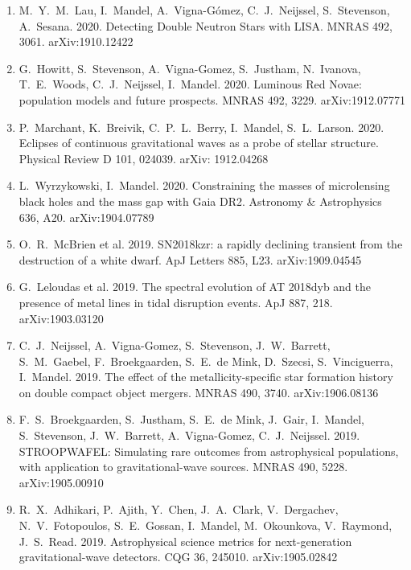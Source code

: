 \documentclass[margin,line]{res}
\begin{document}
\begin{resume}
\begin{enumerate}
\item M.~Y.~M.~Lau, I.~Mandel, A.~Vigna-G\'{o}mez, C.~J.~Neijssel, S.~Stevenson, A.~Sesana.  2020.  Detecting Double Neutron Stars with LISA.  MNRAS 492, 3061.  arXiv:1910.12422

\item G.~Howitt, S.~Stevenson, A.~Vigna-Gomez, S.~Justham, N.~Ivanova, T.~E.~Woods, C.~J.~Neijssel, I.~Mandel.  2020.  Luminous Red Novae: population models and future prospects.  MNRAS 492, 3229.  arXiv:1912.07771 

\item P.~Marchant, K.~Breivik, C.~P.~L.~Berry, I.~Mandel, S.~L.~Larson. 2020.  Eclipses of continuous gravitational waves as a probe of stellar structure.  Physical Review D 101, 024039.
arXiv: 1912.04268

\item L.~Wyrzykowski, I.~Mandel.  2020.  Constraining the masses of microlensing black holes and the mass gap with Gaia DR2.  Astronomy \& Astrophysics 636, A20.  arXiv:1904.07789

\item O.~R.~McBrien et al. 2019. SN2018kzr: a rapidly declining transient from the destruction of a white dwarf. ApJ Letters 885, L23.  arXiv:1909.04545

\item G.~Leloudas et al.  2019. The spectral evolution of AT 2018dyb and the presence of metal lines in tidal disruption events.  ApJ 887, 218.  arXiv:1903.03120

\item C.~J.~Neijssel, A.~Vigna-Gomez, S.~Stevenson, J.~W.~Barrett, S.~M.~Gaebel, F.~Broekgaarden, S.~E.~de Mink, D.~Szecsi, S.~Vinciguerra, I.~Mandel.  2019. The effect of the metallicity-specific star formation history on double compact object mergers.  MNRAS 490, 3740.  arXiv:1906.08136

\item F.~S.~Broekgaarden, S.~Justham, S.~E.~de Mink, J.~Gair, I.~Mandel, S.~Stevenson, J.~W.~Barrett, A.~Vigna-Gomez, C.~J.~Neijssel.  2019. STROOPWAFEL: Simulating rare outcomes from astrophysical populations, with application to gravitational-wave sources.  MNRAS 490, 5228.  arXiv:1905.00910

\item R.~X.~Adhikari, P.~Ajith, Y.~Chen, J.~A.~Clark, V.~Dergachev, N.~V.~Fotopoulos, S.~E.~Gossan, I.~Mandel, M.~Okounkova, V.~Raymond, J.~S.~Read.  2019. Astrophysical science metrics for next-generation gravitational-wave detectors.  CQG 36, 245010.  arXiv:1905.02842


\end{enumerate}
\end{resume}
\end{document}
